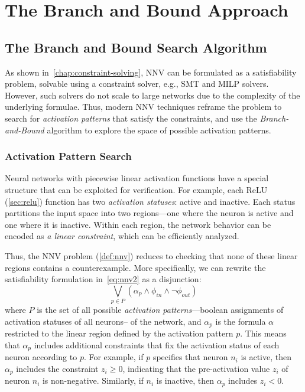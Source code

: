 \documentclass[oneside,11pt,dvipsnames]{book}
\numberwithin{equation}{section}
\theoremstyle{definition}
\theoremstyle{remark}
\begin{document}
\part{The Branch and Bound Approach}\label{part:bab}
\chapter{The Branch and Bound Search Algorithm}\label{chap:bab}

As shown in~\autoref{chap:constraint-solving}, NNV can be formulated as a satisfiability problem, solvable using a constraint solver,  e.g., SMT and MILP solvers.  However, such solvers do not scale to large networks due to the complexity of the underlying formulae. Thus, modern NNV techniques reframe the problem to search for \emph{activation patterns} that satisfy the constraints, and use the \emph{Branch-and-Bound} algorithm to explore the space of possible activation patterns.





\section{Activation Pattern Search}\label{sec:activation-patterns}

Neural networks with piecewise linear activation functions have a special structure that can be exploited for verification.
For example, each ReLU (\autoref{sec:relu}) function
has two \emph{activation statuses}: active and inactive. Each status
partitions the input space into two regions---one where the neuron is active and one where it is inactive.
Within each region, the network behavior can be encoded as \emph{a linear constraint}, which can be efficiently analyzed.

Thus, the NNV problem (\autoref{def:nnv}) reduces to checking that none of these linear regions contains a counterexample. More specifically, we can rewrite the satisfiability formulation in~\autoref{eq:nnv2} as a disjunction:
\begin{equation}\label{eq:nnv3}
  \bigvee_{p \in P} \left( \alpha_p \land \phi_{in} \land \neg \phi_{out} \right)
\end{equation}
where $P$ is the set of all possible \emph{activation patterns}---boolean assignments of activation statuses of all neurons-- of the network, and $\alpha_p$ is the formula $\alpha$ restricted to the linear region defined by the activation pattern $p$. This means that $\alpha_p$ includes additional constraints that fix the activation status of each neuron according to $p$. For example, if $p$ specifies that neuron $n_i$ is active, then $\alpha_p$ includes the constraint $z_i \ge 0$, indicating that the pre-activation value $z_i$ of neuron $n_i$ is non-negative. Similarly, if $n_i$ is inactive, then $\alpha_p$ includes $z_i < 0$.
\end{document}
